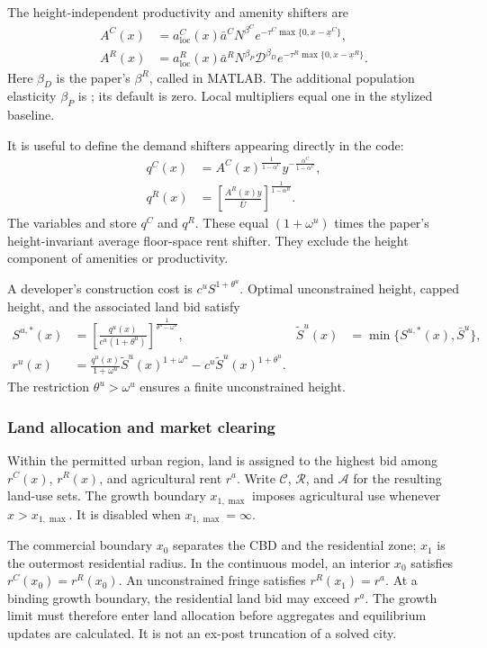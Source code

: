 \documentclass[11pt,a4paper]{article}
\newcommand{\code}[1]{\texttt{\detokenize{#1}}}
\newcommand{\Ubar}{\bar U}
\newcommand{\dens}{\mathcal D}
\newcommand{\Rset}{\mathcal R}
\newcommand{\Cset}{\mathcal C}
\newcommand{\Aset}{\mathcal A}
\begin{document}
The height-independent productivity and amenity shifters are
\begin{align}
 A^C(x)&=a^C_{\mathrm{loc}}(x)\bar a^C N^{\beta^C}
 e^{-\tau^C\max\{0,x-\underline x^C\}},\label{eq:AC}\\
 A^R(x)&=a^R_{\mathrm{loc}}(x)\bar a^R N^{\beta_P}\dens^{\beta_D}
 e^{-\tau^R\max\{0,x-\underline x^R\}}.\label{eq:AR}
\end{align}
Here $\beta_D$ is the paper's $\beta^R$, called \code{beta_dens_R} in MATLAB. The additional population elasticity $\beta_P$ is \code{beta_R}; its default is zero. Local multipliers equal one in the stylized baseline.

It is useful to define the demand shifters appearing directly in the code:
\begin{align}
 q^C(x)&=A^C(x)^{\frac1{1-\alpha^C}}y^{-\frac{\alpha^C}{1-\alpha^C}},\label{eq:qC}\\
 q^R(x)&=\left[\frac{A^R(x)y}{\Ubar}\right]^{\frac1{1-\alpha^R}}.\label{eq:qR}
\end{align}
The variables \code{a_x_C} and \code{a_x_R} store $q^C$ and $q^R$. These equal $(1+\omega^u)$ times the paper's height-invariant average floor-space rent shifter. They exclude the height component of amenities or productivity.

A developer's construction cost is $c^uS^{1+\theta^u}$. Optimal unconstrained height, capped height, and the associated land bid satisfy
\begin{align}
 S^{u,*}(x)&=\left[\frac{q^u(x)}{c^u(1+\theta^u)}\right]^{\frac1{\theta^u-\omega^u}}, &
 \widetilde S^u(x)&=\min\{S^{u,*}(x),\bar S^u\},\label{eq:height}\\
 r^u(x)&=\frac{q^u(x)}{1+\omega^u}\widetilde S^u(x)^{1+\omega^u}
       -c^u\widetilde S^u(x)^{1+\theta^u}.\label{eq:landbid}
\end{align}
The restriction $\theta^u>\omega^u$ ensures a finite unconstrained height.
\clearpage
\subsubsection{Land allocation and market clearing}
Within the permitted urban region, land is assigned to the highest bid among $r^C(x)$, $r^R(x)$, and agricultural rent $r^a$. Write $\Cset$, $\Rset$, and $\Aset$ for the resulting land-use sets. The growth boundary $x_{1,\max}$ imposes agricultural use whenever $x>x_{1,\max}$. It is disabled when $x_{1,\max}=\infty$.

The commercial boundary $x_0$ separates the CBD and the residential zone; $x_1$ is the outermost residential radius. In the continuous model, an interior $x_0$ satisfies $r^C(x_0)=r^R(x_0)$. An unconstrained fringe satisfies $r^R(x_1)=r^a$. At a binding growth boundary, the residential land bid may exceed $r^a$. The growth limit must therefore enter land allocation before aggregates and equilibrium updates are calculated. It is not an ex-post truncation of a solved city.
\end{document}
